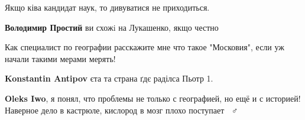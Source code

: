 \begin{itemize}
\begin{itemize}
\end{itemize}

 
Якщо ківа кандидат наук, то дивуватися не приходиться.

\begin{itemize}
 
\textbf{Володимир Простий} ви схожi на Лукашенко, якщо честно
\end{itemize}

 
Как специалист по географии расскажите мне что такое "Московия", если уж начали такими мерами мерять!

\begin{itemize}
 
\textbf{Konstantin Antipov} єта та страна ґдє раділса Пьотр 1.

\begin{itemize}
 
\textbf{Oleks Iwo}, я понял, что проблемы не только с географией, но ещё и с
историей! Наверное дело в кастрюле, кислород в мозг плохо поступает 🤷🏻♂️

 

\end{itemize}
\end{itemize}
\end{itemize}
